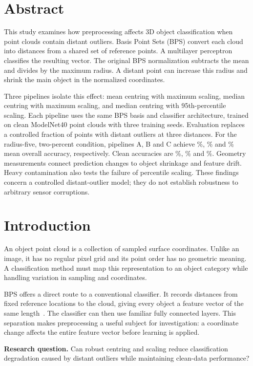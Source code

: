 \documentclass[11pt,a4paper]{article}
\begin{document}
\section*{Abstract}
This study examines how preprocessing affects 3D object classification when point clouds contain distant outliers. Basis Point Sets (BPS) convert each cloud into distances from a shared set of reference points. A multilayer perceptron classifies the resulting vector. The original BPS normalization subtracts the mean and divides by the maximum radius. A distant point can increase this radius and shrink the main object in the normalized coordinates.

Three pipelines isolate this effect: mean centring with maximum scaling, median centring with maximum scaling, and median centring with 95th-percentile scaling. Each pipeline uses the same BPS basis and classifier architecture, trained on clean ModelNet40 point clouds with three training seeds. Evaluation replaces a controlled fraction of points with distant outliers at three distances. For the radius-five, two-percent condition, pipelines A, B and C achieve \PrimaryA\%, \PrimaryB\% and \PrimaryC\% mean overall accuracy, respectively. Clean accuracies are \CleanA\%, \CleanB\% and \CleanC\%. Geometry measurements connect prediction changes to object shrinkage and feature drift. Heavy contamination also tests the failure of percentile scaling. These findings concern a controlled distant-outlier model; they do not establish robustness to arbitrary sensor corruptions.

\section{Introduction}
An object point cloud is a collection of sampled surface coordinates. Unlike an image, it has no regular pixel grid and its point order has no geometric meaning. A classification method must map this representation to an object category while handling variation in sampling and coordinates.

BPS offers a direct route to a conventional classifier. It records distances from fixed reference locations to the cloud, giving every object a feature vector of the same length~\cite{bps}. The classifier can then use familiar fully connected layers. This separation makes preprocessing a useful subject for investigation: a coordinate change affects the entire feature vector before learning is applied.

\textbf{Research question.} Can robust centring and scaling reduce classification degradation caused by distant outliers while maintaining clean-data performance?
\end{document}
